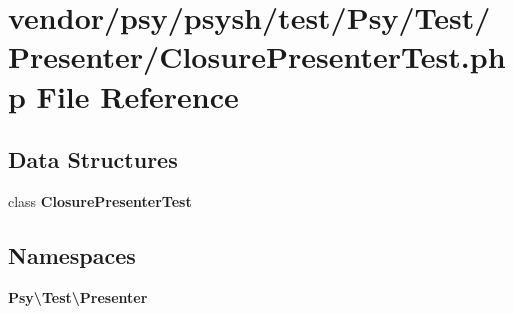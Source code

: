 \section{vendor/psy/psysh/test/\+Psy/\+Test/\+Presenter/\+Closure\+Presenter\+Test.php File Reference}
\label{_closure_presenter_test_8php}
\subsection*{Data Structures}
\begin{DoxyCompactItemize}
\item 
class {\bf Closure\+Presenter\+Test}
\end{DoxyCompactItemize}
\subsection*{Namespaces}
\begin{DoxyCompactItemize}
\item 
 {\bf Psy\textbackslash{}\+Test\textbackslash{}\+Presenter}
\end{DoxyCompactItemize}
